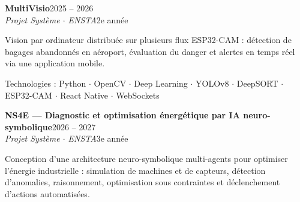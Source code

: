 \documentclass[9pt,a4paper]{extarticle}
\newcommand{\job}[4]{\textbf{#1}\hfill{\color{muted}\footnotesize #3}\\[-2pt]{\color{accent}\itshape #2}\hfill{\color{muted}\footnotesize #4}\par\vspace{1pt}}
\newcommand{\tech}[1]{{\footnotesize\color{accent}#1}\par}
\begin{document}
\job{MultiVisio}{Projet Système $\cdot$ ENSTA}{2025 -- 2026}{2e année}
Vision par ordinateur distribuée sur plusieurs flux ESP32-CAM : détection de bagages abandonnés en aéroport, évaluation du danger et alertes en temps réel via une application mobile.\par
\tech{Technologies : Python $\cdot$ OpenCV $\cdot$ Deep Learning $\cdot$ YOLOv8 $\cdot$ DeepSORT $\cdot$ ESP32-CAM $\cdot$ React Native $\cdot$ WebSockets}

\vspace{2pt}
\job{NS4E --- Diagnostic et optimisation énergétique par IA neuro-symbolique}
{Projet Système $\cdot$ ENSTA}{2026 -- 2027}{3e année}

Conception d'une architecture neuro-symbolique multi-agents pour optimiser
l'énergie industrielle : simulation de machines et de capteurs,
détection d'anomalies, raisonnement, optimisation sous contraintes
et déclenchement d'actions automatisées.\par
\end{document}

